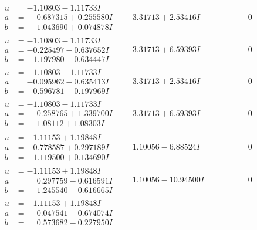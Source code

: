 \documentclass[1p]{elsarticle_modified}
\theoremstyle{definition}
\begin{document}
$$\begin{array}{c|c|c}
\begin{aligned}
u &= -1.10803 - 1.11733 I \\
a &= \phantom{-}0.687315 + 0.255580 I \\
b &= \phantom{-}1.043690 + 0.074878 I\end{aligned}
 & \phantom{-}3.31713 + 2.53416 I & \phantom{-0.000000 } 0 \\ \hline\begin{aligned}
u &= -1.10803 - 1.11733 I \\
a &= -0.225497 - 0.637652 I \\
b &= -1.197980 - 0.634447 I\end{aligned}
 & \phantom{-}3.31713 + 6.59393 I & \phantom{-0.000000 } 0 \\ \hline\begin{aligned}
u &= -1.10803 - 1.11733 I \\
a &= -0.095962 - 0.635413 I \\
b &= -0.596781 - 0.197969 I\end{aligned}
 & \phantom{-}3.31713 + 2.53416 I & \phantom{-0.000000 } 0 \\ \hline\begin{aligned}
u &= -1.10803 - 1.11733 I \\
a &= \phantom{-}0.258765 + 1.339700 I \\
b &= \phantom{-}1.08112 + 1.08303 I\end{aligned}
 & \phantom{-}3.31713 + 6.59393 I & \phantom{-0.000000 } 0 \\ \hline\begin{aligned}
u &= -1.11153 + 1.19848 I \\
a &= -0.778587 + 0.297189 I \\
b &= -1.119500 + 0.134690 I\end{aligned}
 & \phantom{-}1.10056 - 6.88524 I & \phantom{-0.000000 } 0 \\ \hline\begin{aligned}
u &= -1.11153 + 1.19848 I \\
a &= \phantom{-}0.297759 - 0.616591 I \\
b &= \phantom{-}1.245540 - 0.616665 I\end{aligned}
 & \phantom{-}1.10056 - 10.94500 I & \phantom{-0.000000 } 0 \\ \hline\begin{aligned}
u &= -1.11153 + 1.19848 I \\
a &= \phantom{-}0.047541 - 0.674074 I \\
b &= \phantom{-}0.573682 - 0.227950 I\end{aligned}

\end{array}$$
\end{document}
